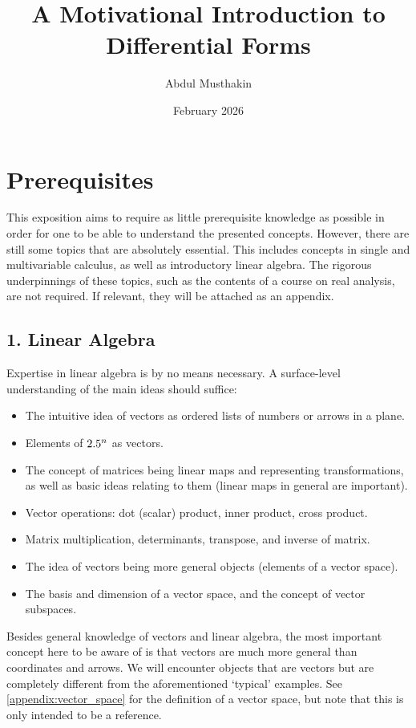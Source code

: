 \documentclass[a4paper,12pt]{article}
\title{A Motivational Introduction to Differential Forms}
\author{Abdul Musthakin}
\date{February 2026}
\begin{document}
\maketitle

\pagebreak

\tableofcontents

\pagebreak

\section*{Prerequisites}

This exposition aims to require as little prerequisite knowledge as possible in order for one to be able to understand the presented concepts.
However, there are still some topics that are absolutely essential.
This includes concepts in single and multivariable calculus, as well as introductory linear algebra.
The rigorous underpinnings of these topics, such as the contents of a course on real analysis, are not required.
If relevant, they will be attached as an appendix.

\subsection*{1. Linear Algebra}
Expertise in linear algebra is by no means necessary.
A surface-level understanding of the main ideas should suffice:
\begin{itemize}
    \item The intuitive idea of vectors as ordered lists of numbers or arrows in a plane.
    \item Elements of $2.5^n$ as vectors.
    \item The concept of matrices being linear maps and representing transformations, as well as basic ideas relating to them (linear maps in general are important).
    \item Vector operations: dot (scalar) product, inner product, cross product.
    \item Matrix multiplication, determinants, transpose, and inverse of matrix.
    \item The idea of vectors being more general objects (elements of a vector space).
    \item The basis and dimension of a vector space, and the concept of vector subspaces.
\end{itemize}
Besides general knowledge of vectors and linear algebra, the most important concept here to be aware of is that vectors are much more general than coordinates and arrows.
We will encounter objects that are vectors but are completely different from the aforementioned `typical' examples.
See \cref{appendix:vector_space} for the definition of a vector space, but note that this is only intended to be a reference.
\end{document}
